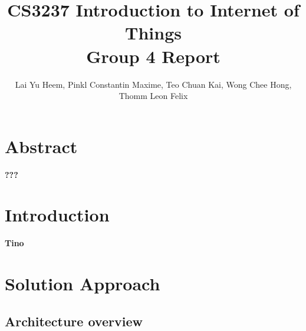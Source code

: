 \documentclass{article}
\begin{document}

\title{CS3237 Introduction to Internet of Things \\ Group 4 Report}
\author{Lai Yu Heem, Pinkl Constantin Maxime, Teo Chuan Kai, Wong Chee Hong, Thomm Leon Felix}
\maketitle

\renewcommand\thesection{\arabic{section}}
\renewcommand\thesubsection{\thesection.\alph{subsection}}

\newcommand\ISquaredC{$\text{I}^2\text{C}$}

\section{Abstract}

\textbf{???}

\section{Introduction}

\textbf{Tino}

\section{Solution Approach}

\subsection{Architecture overview}
\end{document}
